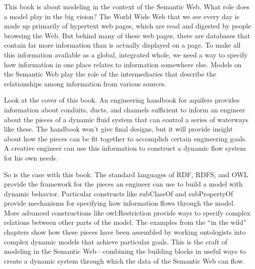This book is about modeling in the context of the Semantic Web. What
role does a model play in the big vision? The World Wide Web that we see
every day is made up primarily of hypertext web pages, which are read and digested
by people browsing the Web. But behind many of these web pages, there
are databases that contain far more information than is actually
displayed on a page. To make all this information available as a global,
integrated whole, we need a way to specify how information in one place
relates to information somewhere else. Models on the Semantic Web play
the role of the intermediaries that describe the relationships among
information from various sources.

Look at the cover of this book. An engineering handbook for aquifers
provides information about conduits, ducts, and channels sufficient to
inform an engineer about the pieces of a dynamic fluid system that can
control a series of waterways like these. The handbook won't give final
designs, but it will provide insight about how the pieces can be fit
together to accomplish certain engineering goals. A creative engineer
can use this information to construct a dynamic flow system for his own
needs.

So is the case with this book. The standard languages of RDF, RDFS, and
OWL provide the framework for the pieces an engineer can use to build a
model with dynamic behavior. Particular constructs like subClassOf and
subPropertyOf provide mechanisms for specifying how information flows
through the model. More advanced constructions like owl:Restriction
provide ways to specify complex relations between other parts of the
model. The examples from the ``in the wild'' chapters show how these
pieces have been assembled by working ontologists into complex dynamic
models that achieve particular goals. This is the craft of modeling in
the Semantic Web---combining the building blocks in useful ways to
create a dynamic system through which the data of the Semantic Web can
flow.
